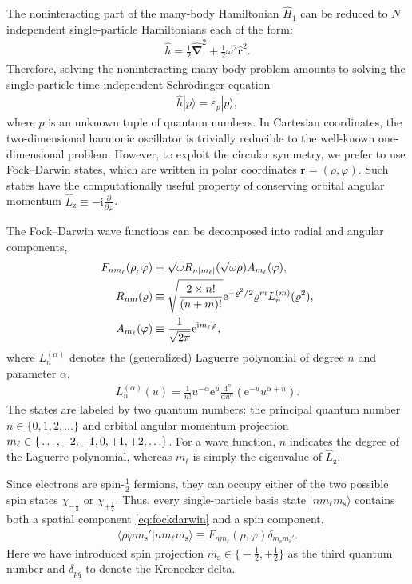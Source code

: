 The noninteracting part of the many-body Hamiltonian $\hat{H}_1$ can be reduced to $N$ independent single-particle Hamiltonians each of the form:
\begin{align*}
  \hat{h} = \frac{1}{2} \hat{\bm{\nabla}}^2 + \frac{1}{2} \omega^2 \hat{\bm{r}}^2.
\end{align*}
Therefore, solving the noninteracting many-body problem amounts to solving the single-particle time-independent Schr\"odinger equation
\begin{align*}
  \hat{h} |p\rangle = \varepsilon_p |p\rangle,
\end{align*}
where $p$ is an unknown tuple of quantum numbers.  In Cartesian coordinates, the two-dimensional harmonic oscillator is trivially reducible to the well-known one-dimensional problem.  However, to exploit the circular symmetry, we prefer to use Fock--Darwin states, which are written in polar coordinates $\bm{r} = (\rho, \varphi)$.  Such states have the computationally useful property of conserving orbital angular momentum $\hat{L}_{\mathrm{z}} \equiv -\mathrm{i} \frac{\partial}{\partial \varphi}$.

The Fock--Darwin wave functions can be decomposed into radial and angular components,\cite{lohne2010coupled}
\begin{align}
  F_{n m_\ell}(\rho, \varphi) &\equiv \sqrt\omega R_{n |m_\ell|}(\sqrt \omega \rho) A_{m_\ell}(\varphi) \label{eq:fockdarwin}, \\
  R_{n m}(\varrho) &\equiv \sqrt{\frac{2 \times n!}{(n + m)!}} \mathrm{e}^{-\varrho^2 / 2} \varrho^m L_n^{(m)}(\varrho^2), \notag \\
  A_{m_\ell}(\varphi) &\equiv \frac{1}{\sqrt{2 \pi}} \mathrm{e}^{\mathrm{i} m_\ell \varphi}, \notag
\end{align}
where $L_n^{(\alpha)}$ denotes the (generalized) Laguerre polynomial \cite{NIST:DLMF} of degree $n$ and parameter $\alpha$,
\begin{align*}
  L_n^{(\alpha)}(u) = \frac{1}{n!} u^{-\alpha} \mathrm{e}^u \frac{\mathrm{d}^n}{\mathrm{d} u^n} (\mathrm{e}^{-u} u^{\alpha + n}).
\end{align*}
The states are labeled by two quantum numbers: the principal quantum number $n \in \{0, 1, 2, \ldots\}$ and orbital angular momentum projection $m_\ell \in \mathbb \{\ldots, -2, -1, 0, +1, +2, \ldots\}$.  For a wave function, $n$ indicates the degree of the Laguerre polynomial, whereas $m_\ell$ is simply the eigenvalue of $\hat{L}_{\mathrm{z}}$.

Since electrons are spin-$\frac{1}{2}$ fermions, they can occupy either of the two possible spin states $\chi_{-\frac{1}{2}}$ or $\chi_{+\frac{1}{2}}$.  Thus, every single-particle basis state $|n m_\ell m_{\mathrm{s}}\rangle$ contains both a spatial component \eqref{eq:fockdarwin} and a spin component,
\begin{align} \label{eq:singleparticlestate}
  \langle \rho \varphi m_{\mathrm{s}}' |n m_\ell m_{\mathrm{s}}\rangle \equiv F_{n m_\ell}(\rho, \varphi) \delta_{m_{\mathrm{s}}^{} m_{\mathrm{s}}'}.
\end{align}
Here we have introduced spin projection $m_{\mathrm{s}} \in \bigl\{-\frac{1}{2}, +\frac{1}{2}\bigr\}$ as the third quantum number and $\delta_{p q}$ to denote the Kronecker delta.


